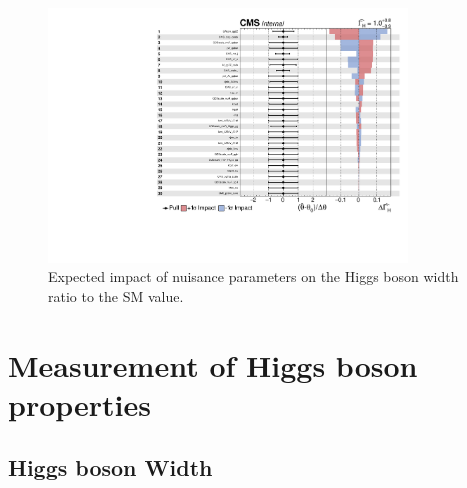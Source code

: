 \begin{figure}[!htb]
\begin{center}
\includegraphics[width=0.85\textwidth]{figures/impacts_all.pdf}
\caption
{
Expected impact of nuisance parameters on the Higgs boson width ratio to the SM value.
\label{fig:impact}
}
\end{center}
\end{figure}

\section{Measurement of Higgs boson properties} \label{sec:results}

\subsection{Higgs boson Width} \label{sec:offshellwidth}



